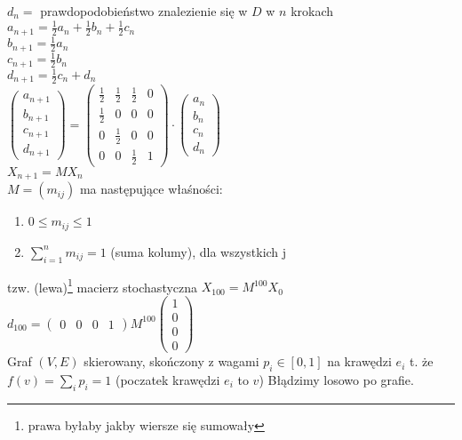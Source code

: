 $d_n=$ prawdopodobieństwo znalezienie się w $D$ w $n$ krokach  \\ 
$a_{n+1} = \frac{1}{2} a_n + \frac{1}{2} b_n + \frac{1}{2} c_n$ \\ 
$b_{n+1} = \frac{1}{2} a_n$ \\ 
$c_{n+1} = \frac{1}{2} b_n$ \\ 
$d_{n+1} = \frac{1}{2} c_n + d_n$ \\
$\begin{pmatrix} a_{n+1} \\ b_{n+1} \\ c_{n+1} \\ d_{n+1} \end{pmatrix} = 
\begin{pmatrix} \frac{1}{2} & \frac{1}{2} & \frac{1}{2} & 0 \\ 
                \frac{1}{2} & 0 & 0 & 0 \\ 
                0 & \frac{1}{2} & 0 & 0 \\ 
            0 & 0 & \frac{1}{2} & 1 \end{pmatrix} \cdot 
            \begin{pmatrix} a_n \\ b_n \\ c_n \\ d_n \end{pmatrix}$ \\ 
$X_{n+1} = M X_n$ \\ 
$M = (m_{ij})$ ma następujące właśności: 
\begin{enumerate} 
    \item $0 \le m_{ij} \le 1$ 
    \item $\sum\limits_{i=1}^n m_{ij} = 1$ (suma kolumy), dla wszystkich j
\end{enumerate} 
tzw. (lewa)\footnote{prawa byłaby jakby wiersze się sumowały} macierz stochastyczna 
$X_{100} = M^{100} X_0$ \\ 
$d_{100} = \begin{pmatrix} 0 & 0 & 0 & 1 \end{pmatrix} M^{100} \begin{pmatrix} 1 \\ 0 \\ 0 \\ 0 \end{pmatrix}$ \\
Graf $(V,E)$ skierowany, skończony z wagami $p_i \in [0,1]$ na krawędzi $e_i$ t. że 
$f(v) = \sum\limits_i p_i = 1$ (poczatek krawędzi $e_i$ to $v$)
Błądzimy losowo po grafie.
